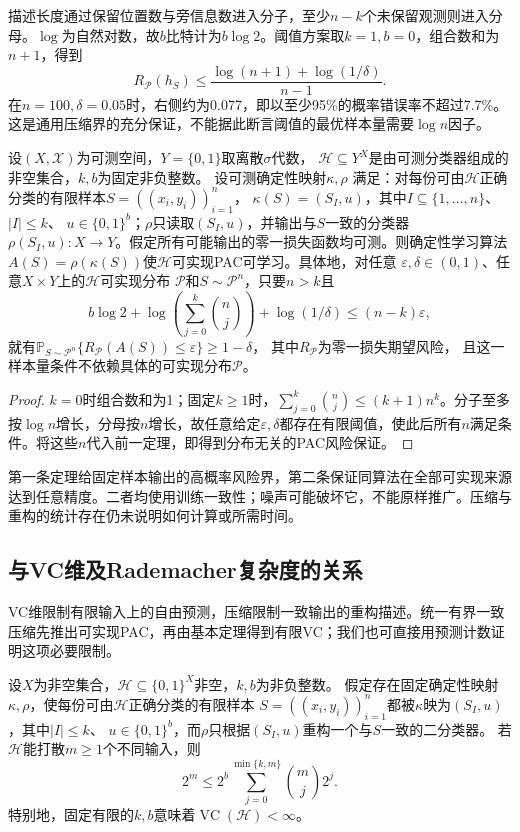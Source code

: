 描述长度通过保留位置数与旁信息数进入分子，至少$n-k$个未保留观测则进入分母。$\log$为自然对数，故$b$比特计为$b\log2$。阈值方案取$k=1,b=0$，组合数和为$n+1$，得到
\[
 R_{\mathcal P}(h_S)\leq\frac{\log(n+1)+\log(1/\delta)}{n-1}.
\]
在$n=100,\delta=0.05$时，右侧约为0.077，即以至少95\%的概率错误率不超过7.7\%。这是通用压缩界的充分保证，不能据此断言阈值的最优样本量需要$\log n$因子。

\begin{theorem}[有界样本压缩推出PAC可学习]
\label{thm:compression-pac-learning}
设$(X,\mathcal X)$为可测空间，$Y=\{0,1\}$取离散$\sigma$代数，
$\mathcal H\subseteq Y^X$是由可测分类器组成的非空集合，$k,b$为固定非负整数。
设可测确定性映射$\kappa,\rho$
满足：对每份可由$\mathcal H$正确分类的有限样本$S=((x_i,y_i))_{i=1}^n$，
$\kappa(S)=(S_I,u)$，其中$I\subseteq\{1,\ldots,n\}$、$|I|\leq k$、
$u\in\{0,1\}^b$；$\rho$只读取$(S_I,u)$，并输出与$S$一致的分类器
$\rho(S_I,u):X\to Y$。假定所有可能输出的零一损失函数均可测。则确定性学习算法
$A(S)=\rho(\kappa(S))$使$\mathcal H$可实现PAC可学习。具体地，对任意
$\varepsilon,\delta\in(0,1)$、任意$X\times Y$上的$\mathcal H$可实现分布
$\mathcal P$和$S\sim\mathcal P^n$，只要$n>k$且
\[
 b\log2+\log\!\left(\sum_{j=0}^k\binom nj\right)+\log(1/\delta)
 \leq(n-k)\varepsilon,
\]
就有$\mathbb P_{S\sim\mathcal P^n}\{R_{\mathcal P}(A(S))\leq\varepsilon\}\geq1-\delta$，
其中$R_{\mathcal P}$为零一损失期望风险，
且这一样本量条件不依赖具体的可实现分布$\mathcal P$。
\end{theorem}

\begin{proof}
$k=0$时组合数和为1；固定$k\geq1$时，$\sum_{j=0}^k\binom nj\leq(k+1)n^k$。分子至多按$\log n$增长，分母按$n$增长，故任意给定$\varepsilon,\delta$都存在有限阈值，使此后所有$n$满足条件。将这些$n$代入前一定理，即得到分布无关的PAC风险保证。
\end{proof}

第一条定理给固定样本输出的高概率风险界，第二条保证同算法在全部可实现来源达到任意精度。二者均使用训练一致性；噪声可能破坏它，不能原样推广。压缩与重构的统计存在仍未说明如何计算或所需时间。

\subsection{与VC维及Rademacher复杂度的关系}

VC维限制有限输入上的自由预测，压缩限制一致输出的重构描述。统一有界一致压缩先推出可实现PAC，再由基本定理得到有限VC；我们也可直接用预测计数证明这项必要限制。

\begin{theorem}[压缩参数对打散的限制]
\label{thm:compression-shattering-count}
设$X$为非空集合，$\mathcal H\subseteq\{0,1\}^X$非空，$k,b$为非负整数。
假定存在固定确定性映射$\kappa,\rho$，使每份可由$\mathcal H$正确分类的有限样本
$S=((x_i,y_i))_{i=1}^n$都被$\kappa$映为$(S_I,u)$，其中$|I|\leq k$、
$u\in\{0,1\}^b$，而$\rho$只根据$(S_I,u)$重构一个与$S$一致的二分类器。
若$\mathcal H$能打散$m\geq1$个不同输入，则
\[
 2^m\leq 2^b\sum_{j=0}^{\min\{k,m\}}\binom mj2^j.
\]
特别地，固定有限的$k,b$意味着$\operatorname{VC}(\mathcal H)<\infty$。
\end{theorem}


